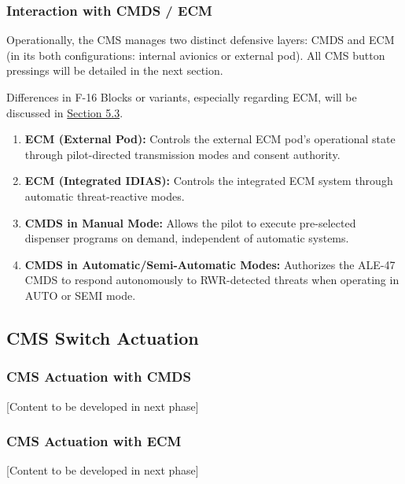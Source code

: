 \documentclass[11pt,a4paper]{article}
\begin{document}
\subsubsection{Interaction with CMDS / ECM}

Operationally, the CMS manages two distinct defensive layers: CMDS and ECM (in its both configurations: internal avionics or external pod). All CMS button pressings will be detailed in the next section.

Differences in F-16 Blocks or variants, especially regarding ECM, will be discussed in \hyperlink{section 5.3}{Section 5.3}.

\begin{enumerate}

\item \textbf{ECM (External Pod):} Controls the external ECM pod's 
operational state through pilot-directed transmission modes 
and consent authority.

\item \textbf{ECM (Integrated IDIAS):} Controls the integrated ECM 
system through automatic threat-reactive modes.

\item \textbf{CMDS in Manual Mode:} Allows the pilot to execute 
pre-selected dispenser programs on demand, independent of 
automatic systems.

\item \textbf{CMDS in Automatic/Semi-Automatic Modes:} Authorizes 
the ALE-47 CMDS to respond autonomously to RWR-detected threats 
when operating in AUTO or SEMI mode.

\end{enumerate}

\subsection{CMS Switch Actuation}

\subsubsection{CMS Actuation with CMDS}

[Content to be developed in next phase]

\subsubsection{CMS Actuation with ECM}

[Content to be developed in next phase]
\end{document}

